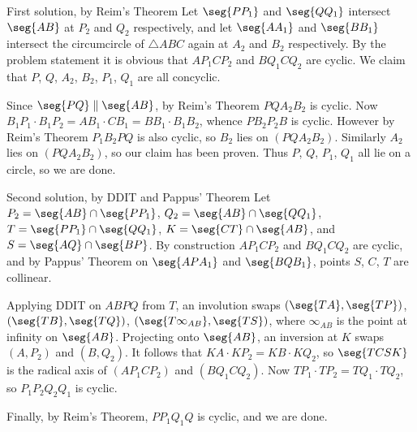 \begin{customenv}{First solution, by Reim's Theorem}
    Let $\seg{PP_1}$ and $\seg{QQ_1}$ intersect $\seg{AB}$ at $P_2$ and $Q_2$ respectively, and let $\seg{AA_1}$ and $\seg{BB_1}$ intersect the circumcircle of $\triangle ABC$ again at $A_2$ and $B_2$ respectively. By the problem statement it is obvious that $AP_1CP_2$ and $BQ_1CQ_2$ are cyclic. We claim that $P$, $Q$, $A_2$, $B_2$, $P_1$, $Q_1$ are all concyclic.

    Since $\seg{PQ}\parallel\seg{AB}$, by Reim's Theorem $PQA_2B_2$ is cyclic. Now $B_1P_1\cdot B_1P_2=AB_1\cdot CB_1=BB_1\cdot B_1B_2$, whence $PB_2P_2B$ is cyclic. However by Reim's Theorem $P_1B_2PQ$ is also cyclic, so $B_2$ lies on $(PQA_2B_2)$. Similarly $A_2$ lies on $(PQA_2B_2)$, so our claim has been proven. Thus $P$, $Q$, $P_1$, $Q_1$ all lie on a circle, so we are done.
\end{customenv}
\begin{customenv}{Second solution, by DDIT and Pappus' Theorem}
    Let $P_2=\seg{AB}\cap\seg{PP_1}$, $Q_2=\seg{AB}\cap\seg{QQ_1}$, $T=\seg{PP_1}\cap\seg{QQ_1}$, $K=\seg{CT}\cap\seg{AB}$, and $S=\seg{AQ}\cap\seg{BP}$. By construction $AP_1CP_2$ and $BQ_1CQ_2$ are cyclic, and by Pappus' Theorem on $\seg{APA_1}$ and $\seg{BQB_1}$, points $S$, $C$, $T$ are collinear.

    Applying DDIT on $ABPQ$ from $T$, an involution swaps $(\seg{TA},\seg{TP})$, $(\seg{TB},\seg{TQ})$, $(\seg{T\infty_{AB}},\seg{TS})$, where $\infty_{AB}$ is the point at infinity on $\seg{AB}$. Projecting onto $\seg{AB}$, an inversion at $K$ swaps $(A,P_2)$ and $(B,Q_2)$. It follows that $KA\cdot KP_2=KB\cdot KQ_2$, so $\seg{TCSK}$ is the radical axis of $(AP_1CP_2)$ and $(BQ_1CQ_2)$. Now $TP_1\cdot TP_2=TQ_1\cdot TQ_2$, so $P_1P_2Q_2Q_1$ is cyclic.

    Finally, by Reim's Theorem, $PP_1Q_1Q$ is cyclic, and we are done.
\end{customenv}
